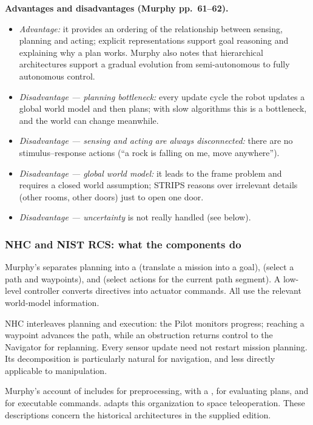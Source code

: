 \textbf{Advantages and disadvantages (Murphy pp.~61--62).}
\begin{itemize}
\item \emph{Advantage:} it provides an ordering of the relationship between sensing, planning and acting; explicit representations support goal reasoning and explaining why a plan works. Murphy also notes that hierarchical architectures support a gradual evolution from semi-autonomous to fully autonomous control.
\item \emph{Disadvantage --- planning bottleneck:} every update cycle the robot updates a global world model and then plans; with slow algorithms this is a bottleneck, and the world can change meanwhile.
\item \emph{Disadvantage --- sensing and acting are always disconnected:} there are no stimulus--response actions (``a rock is falling on me, move anywhere'').
\item \emph{Disadvantage --- global world model:} it leads to the frame problem and requires a closed world assumption; STRIPS reasons over irrelevant details (other rooms, other doors) just to open one door.
\item \emph{Disadvantage --- uncertainty} is not really handled (see below).
\end{itemize}

\subsubsection{NHC and NIST RCS: what the components do}
Murphy's  separates planning into a  (translate a mission into a goal),  (select a path and waypoints), and  (select actions for the current path segment). A low-level controller converts directives into actuator commands. All use the relevant world-model information.

NHC interleaves planning and execution: the Pilot monitors progress; reaching a waypoint advances the path, while an obstruction returns control to the Navigator for replanning. Every sensor update need not restart mission planning. Its decomposition is particularly natural for navigation, and less directly applicable to manipulation.

Murphy's account of  includes  for preprocessing,  with a ,  for evaluating plans, and  for executable commands.  adapts this organization to space teleoperation. These descriptions concern the historical architectures in the supplied edition.

